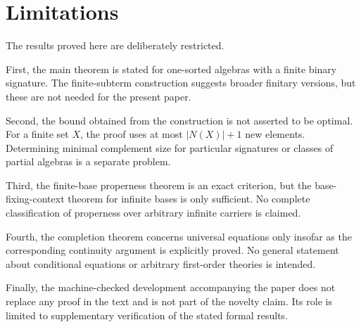 \section{Limitations}\label{sec:limitations}

The results proved here are deliberately restricted.

First, the main theorem is stated for one-sorted algebras with a finite binary
signature.  The finite-subterm construction suggests broader finitary versions,
but these are not needed for the present paper.

Second, the bound obtained from the construction is not asserted to be optimal.
For a finite set $X$, the proof uses at most $|N(X)|+1$ new elements.  Determining
minimal complement size for particular signatures or classes of partial
algebras is a separate problem.

Third, the finite-base properness theorem is an exact criterion, but the
base-fixing-context theorem for infinite bases is only sufficient.  No complete
classification of properness over arbitrary infinite carriers is claimed.

Fourth, the completion theorem concerns universal equations only insofar as the
corresponding continuity argument is explicitly proved.  No general statement
about conditional equations or arbitrary first-order theories is intended.

Finally, the machine-checked development accompanying the paper does not replace
any proof in the text and is not part of the novelty claim.  Its role is limited
to supplementary verification of the stated formal results.
